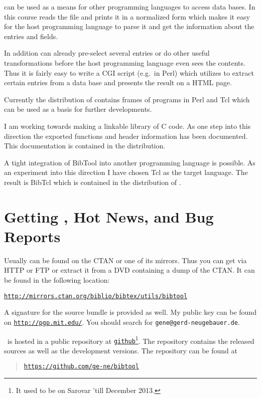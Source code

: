 \documentclass[11pt,a4paper]{scrbook}
\makeatletter
\newcommand\Link[2]{\href{#1}{\texttt{#2}}}
\let\BIBTEX\BibTeX
\renewcommand\BibTeX{\BIBTEX\index{bibtex@\BIBTEX}}
\makeatother
\begin{document}
\BibTool{} can be used as a means for other programming languages to access
\BibTeX{} data bases. In this course \BibTool{} reads the \BibTeX{} file and
prints it in a normalized form which makes it easy for the host programming
language to parse it and get the information about the entries and fields.

In addition \BibTool{} can already pre-select several entries or do other
useful transformations before the host programming language even sees the
contents.  Thus it is fairly easy to write a CGI script (e.g.\ in Perl) which
utilizes \BibTool{} to extract certain entries from a \BibTeX{} data base and
presents the result on a HTML page.

Currently the distribution of \BibTool{} contains frames of programs in Perl
and Tcl which can be used as a basis for further developments.

I am working towards making \BibTool{} a linkable library of C code. As one
step into this direction the exported functions and header information has
been documented. This documentation is contained in the distribution.

A tight integration of BibTool into another programming language is possible.
As an experiment into this direction I have chosen Tcl as the target language.
The result is BibTcl which is contained in the distribution of \BibTool.


\section{Getting \BibTool, Hot News, and Bug Reports}

Usually \BibTool{} can be found on the CTAN or one of its mirrors. Thus you
can get \BibTool{} via HTTP or FTP or extract it from a DVD containing a dump
of the CTAN. It can be found in the following location:
\begin{list}{}{}
\item \Link{http://mirrors.ctan.org/biblio/bibtex/utils/bibtool}%
  {http://mirrors.ctan.org/biblio/bibtex/utils/bibtool}
\end{list}

A signature for the source bundle is provided as well. My public key can be
found  on \Link{http://pgp.mit.edu/}{http://pgp.mit.edu/}. You should search
for \texttt{gene@gerd-neugebauer.de}.

\BibTool\ is hosted in a public repository at
\Link{https://github.com}{github}\footnote{It used to be on
  Sarovar 'till December 2013.}. The repository contains the released sources
as well as the development versions. The repository can be found at
\begin{quote}
  \Link{https://github.com/ge-ne/bibtool}{https://github.com/ge-ne/bibtool}
\end{quote}
\end{document}
